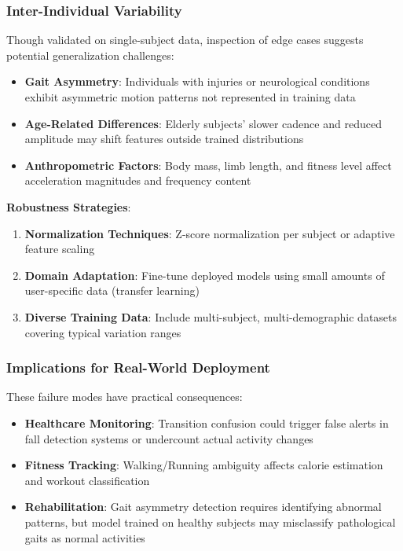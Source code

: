 \subsubsection{Inter-Individual Variability}
Though validated on single-subject data, inspection of edge cases suggests potential generalization challenges:
\begin{itemize}
    \item \textbf{Gait Asymmetry}: Individuals with injuries or neurological conditions exhibit asymmetric motion patterns not represented in training data
    \item \textbf{Age-Related Differences}: Elderly subjects' slower cadence and reduced amplitude may shift features outside trained distributions
    \item \textbf{Anthropometric Factors}: Body mass, limb length, and fitness level affect acceleration magnitudes and frequency content
\end{itemize}

\textbf{Robustness Strategies}:
\begin{enumerate}
    \item \textbf{Normalization Techniques}: Z-score normalization per subject or adaptive feature scaling
    \item \textbf{Domain Adaptation}: Fine-tune deployed models using small amounts of user-specific data (transfer learning)
    \item \textbf{Diverse Training Data}: Include multi-subject, multi-demographic datasets covering typical variation ranges
\end{enumerate}

\subsubsection{Implications for Real-World Deployment}
These failure modes have practical consequences:
\begin{itemize}
    \item \textbf{Healthcare Monitoring}: Transition confusion could trigger false alerts in fall detection systems or undercount actual activity changes
    \item \textbf{Fitness Tracking}: Walking/Running ambiguity affects calorie estimation and workout classification
    \item \textbf{Rehabilitation}: Gait asymmetry detection requires identifying abnormal patterns, but model trained on healthy subjects may misclassify pathological gaits as normal activities
\end{itemize}

